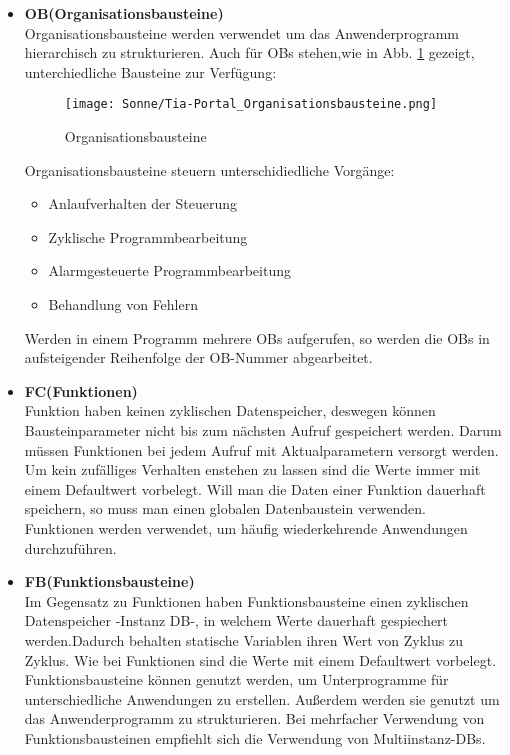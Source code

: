     \begin{itemize}
        \item[1.] \textbf{OB(Organisationsbausteine)} \\
            Organisationsbausteine werden verwendet um das Anwenderprogramm hierarchisch zu strukturieren. Auch für OBs stehen,wie in Abb. \ref{Organisationsbausteine} gezeigt, unterchiedliche Bausteine zur Verfügung:
            \begin{figure}[h]
                \texttt{[image: Sonne/Tia-Portal\_Organisationsbausteine.png]}
                \caption{Organisationsbausteine}
                \label{Organisationsbausteine}
            \end{figure}

            Organisationsbausteine steuern unterschidiedliche Vorgänge:
            \begin{itemize}
                \item Anlaufverhalten der Steuerung
                \item Zyklische Programmbearbeitung
                \item Alarmgesteuerte Programmbearbeitung
                \item Behandlung von Fehlern
            \end{itemize}
            Werden in einem Programm mehrere OBs aufgerufen, so werden die OBs in aufsteigender Reihenfolge der OB-Nummer abgearbeitet. 
            \cite{Programmierleitfaden_für_S7-1500}

        \item[2.] \textbf{FC(Funktionen)} \\
            Funktion haben keinen zyklischen Datenspeicher, deswegen können Bausteinparameter nicht bis zum nächsten Aufruf gespeichert werden. Darum müssen Funktionen bei jedem Aufruf mit Aktualparametern versorgt werden. Um kein zufälliges Verhalten enstehen zu lassen sind die Werte immer mit einem Defaultwert vorbelegt. Will man die Daten einer Funktion dauerhaft speichern, so muss man einen globalen Datenbaustein verwenden.\\
            Funktionen werden verwendet, um häufig wiederkehrende Anwendungen durchzuführen.
            \cite{Programmierleitfaden_für_S7-1500}
            
        \item[3.] \textbf{FB(Funktionsbausteine)} \\
            Im Gegensatz zu Funktionen haben Funktionsbausteine einen zyklischen Datenspeicher -Instanz DB-, in welchem Werte dauerhaft gespiechert werden.Dadurch behalten statische Variablen ihren Wert von Zyklus zu Zyklus. Wie bei Funktionen sind die Werte mit einem Defaultwert vorbelegt.\\
            Funktionsbausteine können genutzt werden, um Unterprogramme für unterschiedliche Anwendungen zu erstellen. Außerdem werden sie genutzt um das Anwenderprogramm zu strukturieren. Bei mehrfacher Verwendung von Funktionsbausteinen empfiehlt sich die Verwendung von Multiinstanz-DBs.
            \cite{Programmierleitfaden_für_S7-1500}
        

\end{itemize}
